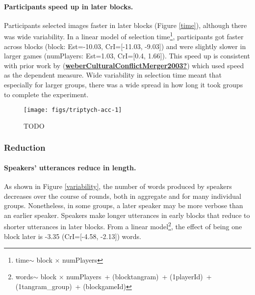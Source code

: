 \documentclass[
  english,
  a4paper,
]{article}
\begin{document}
\hypertarget{participants-speed-up-in-later-blocks.}{%
\paragraph{Participants speed up in later blocks.}\label{participants-speed-up-in-later-blocks.}}

Participants selected images faster in later blocks (Figure \ref{time}), although there was wide variability. In a linear model of selection time\footnote{time\(\sim\) block \(\times\) numPlayers}, participants got faster across blocks (block: Est=-10.03, CrI={[}-11.03, -9.03{]}) and were slightly slower in larger games (numPlayers: Est=1.03, CrI={[}0.4, 1.66{]}). This speed up is consistent with prior work by (\protect\hyperlink{ref-weberCulturalConflictMerger2003}{\textbf{weberCulturalConflictMerger2003?}}) which used speed as the dependent measure. Wide variability in selection time meant that especially for larger groups, there was a wide spread in how long it took groups to complete the experiment.

\begin{figure*}[t!]

{\centering \texttt{[image: figs/triptych-acc-1]} 

}

\caption{TODO}\label{fig:triptych-acc}
\end{figure*}

\hypertarget{reduction}{%
\subsubsection{Reduction}\label{reduction}}

\hypertarget{speakers-utterances-reduce-in-length.}{%
\paragraph{Speakers' utterances reduce in length.}\label{speakers-utterances-reduce-in-length.}}

As shown in Figure \ref{variability}, the number of words produced by speakers decreases over the course of rounds, both in aggregate and for many individual groups. Nonetheless, in some groups, a later speaker may be more verbose than an earlier speaker. Speakers make longer utterances in early blocks that reduce to shorter utterances in later blocks. From a linear model\footnote{words\(\sim\) block \(\times\) numPlayers~+ (block\textbar tangram)~+ (1\textbar playerId)~+ (1\textbar tangram\_group)~+ (block\textbar gameId)}, the effect of being one block later is -3.35 (CrI={[}-4.58, -2.13{]}) words.
\end{document}
